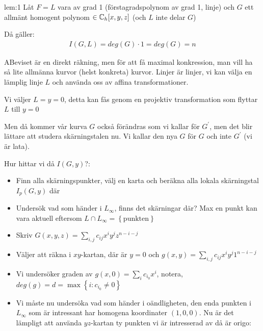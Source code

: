 \par\bigskip
\begin{lem}[1]{lem:1}
  Låt $F = L$ vara av grad 1 (förstagradspolynom av grad 1, linje) och $G$ ett allmänt homogent polynom $\in\mathbb{C}_h[x,y,z]$ (och $L$ inte delar $G$) \par
  \noindent Då gäller:
  \begin{equation*}
    \begin{gathered}
      I(G,L) = deg(G)\cdot1=deg(G)=n
    \end{gathered}
  \end{equation*}
\end{lem}
\newpage
\begin{prf}
  ABeviset är en direkt räkning, men för att få maximal konkression, man vill ha så lite allmänna kurvor (helst konkreta) kurvor. Linjer är linjer, vi kan välja en lämplig linje $L$ och använda oss av affina transformationer.
  \par\bigskip
  \noindent Vi väljer $L=y=0$, detta kan fås genom en projektiv transformation som flyttar $L$ till $y=0$ \par
  \noindent Men då kommer vår kurva $G$ också förändras som vi kallar för $G^{\prime}$, men det blir lättare att studera skärningstalen nu. Vi kallar den nya $G$ för $G$ och inte $G^{\prime}$ (vi är lata).
  \par\bigskip
  \noindent Hur hittar vi då $I(G,y)$?:
  \begin{itemize}
    \item Finn alla skärningspunkter, välj en karta och beräkna alla lokala skärningstal $I_p(G,y)$ där
    \item Undersök vad som händer i $L_\infty$, finns det skärningar där? Max en punkt kan vara aktuell eftersom $L\cap L_\infty = \left\{\text{punkten}\right\}$\\
    \item Skriv $G(x,y,z) = \sum_{i,j} c_{ij}x^iy^jz^{n-i-j}$
    \item Väljer att räkna i $xy$-kartan, där är $y=0$ och $g(x,y)=\sum_{i,j}c_{ij}x^iy^j1^{n-i-j}$
    \item Vi undersöker graden av $g(x,0)=\sum_i c_{i_0}x^i$, notera, $deg(g) = d= \max\left\{i:c_{i_0}\neq0\right\}$
    \item Vi måste nu undersöka vad som händer i oändligheten, den enda punkten i $L_\infty$ som är intressant har homogena koordinater $(1,0,0)$. Nu är det lämpligt att använda $yz$-kartan ty punkten vi är intresserad av då är origo:
      \begin{equation*}

\end{equation*}
\end{itemize}
\end{prf}
